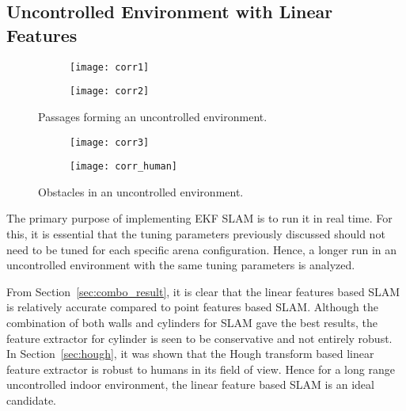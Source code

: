 \subsection{Uncontrolled Environment with Linear Features}

\begin{figure}
    \centering
    \begin{subfigure}[b]{0.45\textwidth}
	    \texttt{[image: corr1]}
    \end{subfigure}
    \quad %
    \begin{subfigure}[b]{0.45\textwidth}
        \texttt{[image: corr2]}
    \end{subfigure}%

    \caption{Passages forming an uncontrolled environment.}
    \label{fig:onboard_1}
\end{figure}

\begin{figure}
    \centering
    \begin{subfigure}[b]{0.45\textwidth}
	    \texttt{[image: corr3]}
    \end{subfigure}
    \quad %
    \begin{subfigure}[b]{0.45\textwidth}
        \texttt{[image: corr\_human]}
    \end{subfigure}%

    \caption{Obstacles in an uncontrolled environment.}
    \label{fig:onboard_2}
\end{figure}
The primary purpose of implementing EKF SLAM is to run it in real time. For this, it is essential that the tuning parameters previously discussed should not need to be tuned for each specific arena configuration. Hence, a longer run in an uncontrolled environment  with the same tuning parameters is analyzed.

From Section~\ref{sec:combo_result}, it is clear that the linear features based SLAM is relatively accurate compared to point features based SLAM. Although the combination of both walls and cylinders for SLAM gave the best results, the feature extractor for cylinder is seen to be conservative and not entirely robust. In Section~\ref{sec:hough}, it was shown that the Hough transform based linear feature extractor is robust to humans in its field of view. Hence for a long range uncontrolled indoor environment, the linear feature based SLAM is an ideal candidate. 

